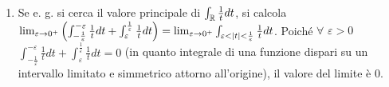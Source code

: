 \documentclass{article}
\begin{document}
\begin{enumerate}
\item Se e. g. si cerca il valore principale di $\int_{%
\mathbb{R}
}\frac{1}{t}dt$, si calcola $\lim_{\varepsilon \rightarrow 0^{+}}\left(
\int_{-\frac{1}{\varepsilon }}^{-\varepsilon }\frac{1}{t}dt+\int_{%
\varepsilon }^{\frac{1}{\varepsilon }}\frac{1}{t}dt\right)
=\lim_{\varepsilon \rightarrow 0^{+}}\int_{\varepsilon <\left\vert
t\right\vert <\frac{1}{\varepsilon }}\frac{1}{t}dt$. Poich\'{e} $\forall $ $%
\varepsilon >0$ $\int_{-\frac{1}{\varepsilon }}^{-\varepsilon }\frac{1}{t}%
dt+\int_{\varepsilon }^{\frac{1}{\varepsilon }}\frac{1}{t}dt=0$ (in quanto
integrale di una funzione dispari su un intervallo limitato e simmetrico
attorno all'origine), il valore del limite \`{e} $0$.
\end{enumerate}
\end{document}
